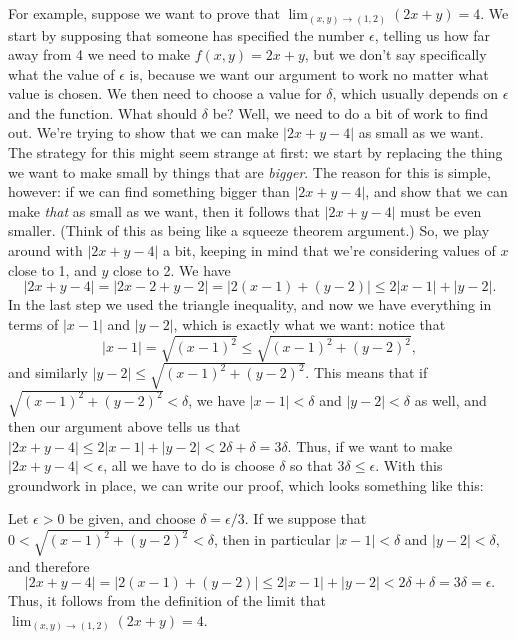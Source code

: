 \documentclass[letterpaper,12pt]{article}
\newcommand{\abs}[1]{\lvert #1\rvert}
\newcommand{\di}{\displaystyle}
\begin{document}
For example, suppose we want to prove that $\di \lim_{(x,y)\to (1,2)}(2x+y)=4$. We start by supposing that someone has specified the number $\epsilon$, telling us how far away from 4 we need to make $f(x,y)=2x+y$, but we don't say specifically what the value of $\epsilon$ is, because we want our argument to work no matter what value is chosen. We then need to choose a value for $\delta$, which usually depends on $\epsilon$ and the function. What should $\delta$ be? Well, we need to do a bit of work to find out. We're trying to show that we can make $\abs{2x+y-4}$ as small as we want. The strategy for this might seem strange at first: we start by replacing the thing we want to make small by things that are {\em bigger}. The reason for this is simple, however: if we can find something bigger than $\abs{2x+y-4}$, and show that we can make {\em that} as small as we want, then it follows that $\abs{2x+y-4}$ must be even smaller. (Think of this as being like a squeeze theorem argument.) So, we play around with $\abs{2x+y-4}$ a bit, keeping in mind that we're considering values of $x$ close to 1, and $y$ close to 2. We have
\[
 \abs{2x+y-4} = \abs{2x-2+y-2} = \abs{2(x-1)+(y-2)} \leq 2\abs{x-1}+\abs{y-2}.
\]
In the last step we used the triangle inequality, and now we have everything in terms of $\abs{x-1}$ and $\abs{y-2}$, which is exactly what we want: notice that
\[
 \abs{x-1} = \sqrt{(x-1)^2}\leq \sqrt{(x-1)^2+(y-2)^2},
\]
and similarly $\abs{y-2}\leq \sqrt{(x-1)^2+(y-2)^2}$. This means that if $\sqrt{(x-1)^2+(y-2)^2}<\delta$, we have $\abs{x-1}<\delta$ and $\abs{y-2}<\delta$ as well, and then our argument above tells us that $\abs{2x+y-4} \leq 2\abs{x-1}+\abs{y-2}<2\delta+\delta=3\delta$. Thus, if we want to make $\abs{2x+y-4}<\epsilon$, all we have to do is choose $\delta$ so that $3\delta\leq \epsilon$. With this groundwork in place, we can write our proof, which looks something like this:

\medskip

Let $\epsilon>0$ be given, and choose $\delta = \epsilon/3$. If we suppose that $0<\sqrt{(x-1)^2+(y-2)^2}<\delta$, then in particular $\abs{x-1}<\delta$ and $\abs{y-2}<\delta$, and therefore
\[
 \abs{2x+y-4} = \abs{2(x-1)+(y-2)} \leq 2\abs{x-1}+\abs{y-2}<2\delta+\delta = 3\delta = \epsilon.
\]
Thus, it follows from the definition of the limit that $\di \lim_{(x,y)\to (1,2)}(2x+y)=4$.

\medskip
\end{document}
